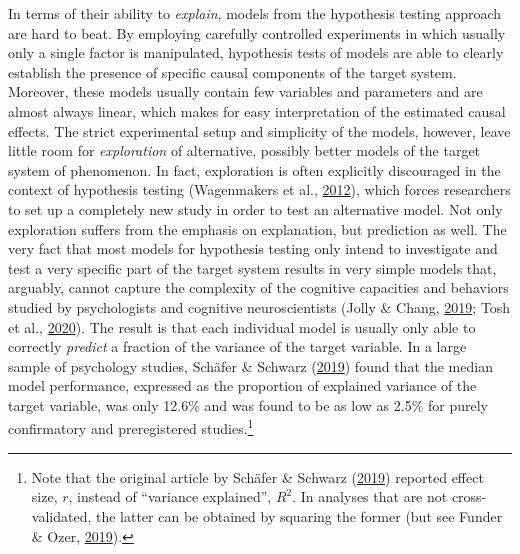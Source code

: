 \documentclass[11pt,american,a4paper,oneside,]{memoir} %
\let\rmarkdownfootnote\footnote%
\def\footnote{\protect\rmarkdownfootnote}
\begin{document}
In terms of their ability to \emph{explain}, models from the hypothesis testing approach are hard to beat. By employing carefully controlled experiments in which usually only a single factor is manipulated, hypothesis tests of models are able to clearly establish the presence of specific causal components of the target system. Moreover, these models usually contain few variables and parameters and are almost always linear, which makes for easy interpretation of the estimated causal effects. The strict experimental setup and simplicity of the models, however, leave little room for \emph{exploration} of alternative, possibly better models of the target system of phenomenon. In fact, exploration is often explicitly discouraged in the context of hypothesis testing (Wagenmakers et al., \protect\hyperlink{ref-Wagenmakers2012-vd}{2012}), which forces researchers to set up a completely new study in order to test an alternative model. Not only exploration suffers from the emphasis on explanation, but prediction as well. The very fact that most models for hypothesis testing only intend to investigate and test a very specific part of the target system results in very simple models that, arguably, cannot capture the complexity of the cognitive capacities and behaviors studied by psychologists and cognitive neuroscientists (Jolly \& Chang, \protect\hyperlink{ref-Jolly2019-lx}{2019}; Tosh et al., \protect\hyperlink{ref-Tosh2020-sf}{2020}). The result is that each individual model is usually only able to correctly \emph{predict} a fraction of the variance of the target variable. In a large sample of psychology studies, Schäfer \& Schwarz (\protect\hyperlink{ref-Schafer2019-ue}{2019}) found that the median model performance, expressed as the proportion of explained variance of the target variable, was only 12.6\% and was found to be as low as 2.5\% for purely confirmatory and preregistered studies.\footnote{Note that the original article by Schäfer \& Schwarz (\protect\hyperlink{ref-Schafer2019-ue}{2019}) reported effect size, \(r\), instead of ``variance explained'', \(R^{2}\). In analyses that are not cross-validated, the latter can be obtained by squaring the former (but see Funder \& Ozer, \protect\hyperlink{ref-Funder2019-ow}{2019}).}
\end{document}
